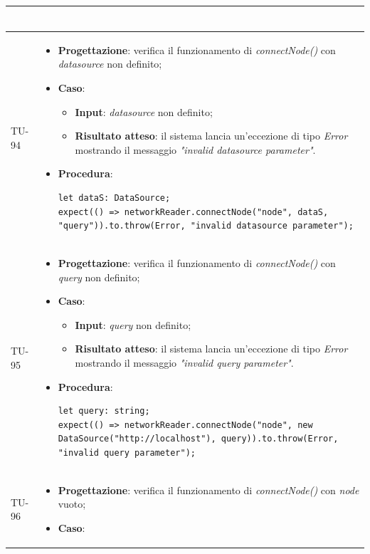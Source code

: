 \begin{longtable}{|C{1.5cm}|C{14.5cm}|}
\begin{itemize}
\begin{lstlisting}
	\end{lstlisting}
\end{itemize}\\
\hline
{TU-94} &
\begin{itemize}
	\item \textbf{Progettazione}: verifica il funzionamento di \emph{connectNode()} con \emph{datasource} non definito;
	\item \textbf{Caso}: 
	\begin{itemize}
		\item \textbf{Input}: \emph{datasource} non definito;
		\item \textbf{Risultato atteso}: il sistema lancia un'eccezione di tipo \emph{Error} mostrando il messaggio \emph{"invalid datasource parameter"}.
	\end{itemize}
	\item \textbf{Procedura}:
	\begin{lstlisting}
let dataS: DataSource;
expect(() => networkReader.connectNode("node", dataS, "query")).to.throw(Error, "invalid datasource parameter");
	\end{lstlisting}
\end{itemize}\\
\hline
{TU-95} &
\begin{itemize}
	\item \textbf{Progettazione}: verifica il funzionamento di \emph{connectNode()} con \emph{query} non definito;
	\item \textbf{Caso}: 
	\begin{itemize}
		\item \textbf{Input}: \emph{query} non definito;
		\item \textbf{Risultato atteso}: il sistema lancia un'eccezione di tipo \emph{Error} mostrando il messaggio \emph{"invalid query parameter"}.
	\end{itemize}
	\item \textbf{Procedura}:
	\begin{lstlisting}
let query: string;
expect(() => networkReader.connectNode("node", new DataSource("http://localhost"), query)).to.throw(Error, "invalid query parameter");
	\end{lstlisting}
\end{itemize}\\
\hline
{TU-96} &
\begin{itemize}
	\item \textbf{Progettazione}: verifica il funzionamento di \emph{connectNode()} con \emph{node} vuoto;
	\item \textbf{Caso}: 

\end{itemize}
\end{longtable}
